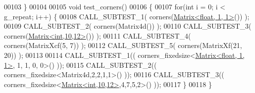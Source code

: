 \begin{DoxyCode}
00103 \}
00104 
00105 \textcolor{keywordtype}{void} test\_corners()
00106 \{
00107   \textcolor{keywordflow}{for}(\textcolor{keywordtype}{int} i = 0; i < g\_repeat; i++) \{
00108     CALL\_SUBTEST\_1( corners(\hyperlink{group___core___module_class_eigen_1_1_matrix}{Matrix<float, 1, 1>}()) );
00109     CALL\_SUBTEST\_2( corners(Matrix4d()) );
00110     CALL\_SUBTEST\_3( corners(\hyperlink{group___core___module_class_eigen_1_1_matrix}{Matrix<int,10,12>}()) );
00111     CALL\_SUBTEST\_4( corners(MatrixXcf(5, 7)) );
00112     CALL\_SUBTEST\_5( corners(MatrixXf(21, 20)) );
00113 
00114     CALL\_SUBTEST\_1(( corners\_fixedsize<\hyperlink{group___core___module_class_eigen_1_1_matrix}{Matrix<float, 1, 1>}, 1, 1, 0, 0>() ));
00115     CALL\_SUBTEST\_2(( corners\_fixedsize<Matrix4d,2,2,1,1>() ));
00116     CALL\_SUBTEST\_3(( corners\_fixedsize<\hyperlink{group___core___module_class_eigen_1_1_matrix}{Matrix<int,10,12>},4,7,5,2>() ));
00117   \}
00118 \}
\end{DoxyCode}

